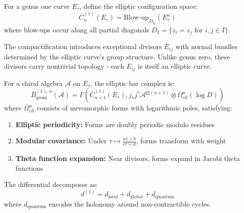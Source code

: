 \begin{definition}\label{def:elliptic-config}
For a genus one curve $E_\tau$, define the elliptic configuration space:
$$\overline{C}_n^{(1)}(E_\tau) = \text{Blow-up}_{D_{ij}}(E_\tau^n)$$
where blow-ups occur along all partial diagonals $D_I = \{z_i = z_j \text{ for } i,j \in I\}$.

The compactification introduces exceptional divisors $E_{ij}$ with normal bundles determined by the elliptic curve's group structure. Unlike genus zero, these divisors carry nontrivial topology - each $E_{ij}$ is itself an elliptic curve.
\end{definition}

\begin{theorem}\label{thm:elliptic-bar}
For a chiral algebra $\mathcal{A}$ on $E_\tau$, the elliptic bar complex is:
$$\bar{B}^{(1),n}_{\text{geom}}(\mathcal{A}) = \Gamma\left(\overline{C}_{n+1}^{(1)}(E_\tau), j_*j^*\mathcal{A}^{\boxtimes(n+1)} \otimes \Omega^n_{ell}(\log D)\right)$$
where $\Omega^n_{ell}$ consists of meromorphic forms with logarithmic poles, satisfying:
\begin{enumerate}
\item \textbf{Elliptic periodicity:} Forms are doubly periodic modulo residues
\item \textbf{Modular covariance:} Under $\tau \mapsto \frac{a\tau + b}{c\tau + d}$, forms transform with weight
\item \textbf{Theta function expansion:} Near divisors, forms expand in Jacobi theta functions
\end{enumerate}

The differential decomposes as:
$$d^{(1)} = d_{\text{local}} + d_{\text{global}} + d_{\text{quantum}}$$
where $d_{\text{quantum}}$ encodes the holonomy around non-contractible cycles.
\end{theorem}


